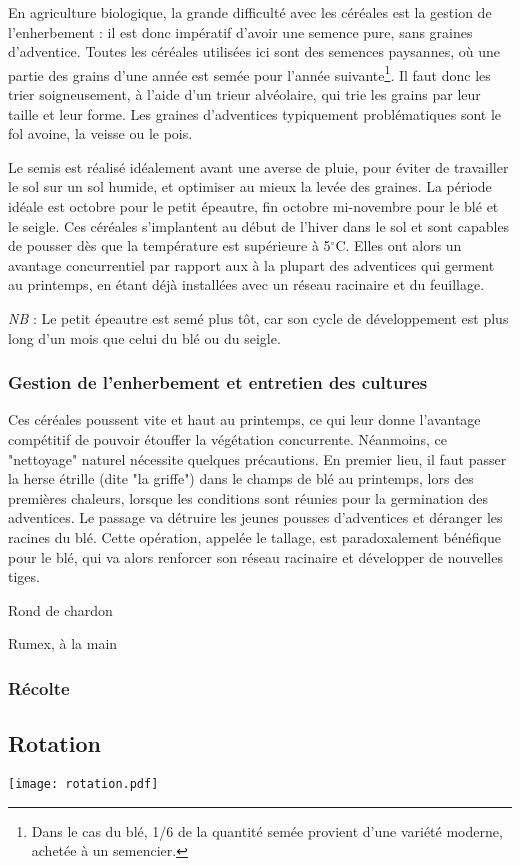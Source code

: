 \documentclass{article}
\begin{document}
En agriculture biologique, la grande difficulté avec les céréales est la gestion de l'enherbement : il est donc impératif d'avoir une semence pure, sans graines d'adventice. Toutes les céréales utilisées ici sont des semences paysannes, où une partie des grains d'une année est semée pour l'année suivante\footnote{Dans le cas du blé, 1/6 de la quantité semée provient d'une variété moderne, achetée à un semencier.}. Il faut donc les trier soigneusement, à l'aide d'un trieur alvéolaire, qui trie les grains par leur taille et leur forme. Les graines d'adventices typiquement problématiques sont le fol avoine, la veisse ou le pois. 

Le semis est réalisé idéalement avant une averse de pluie, pour éviter de travailler le sol sur un sol humide, et optimiser au mieux la levée des graines. La période idéale est octobre pour le petit épeautre, fin octobre mi-novembre pour le blé et le seigle. Ces céréales s'implantent au début de l'hiver dans le sol et sont capables de pousser dès que la température est supérieure à 5$^\circ$C. Elles ont alors un avantage concurrentiel par rapport aux à la plupart des adventices qui germent au printemps, en étant déjà installées avec un réseau racinaire et du feuillage.

\textit{NB} : Le petit épeautre est semé plus tôt, car son cycle de développement est plus long d'un mois que celui du blé ou du seigle.

\subsubsection*{Gestion de l'enherbement et entretien des cultures}

Ces céréales poussent vite et haut au printemps, ce qui leur donne l'avantage compétitif de pouvoir étouffer la végétation concurrente. Néanmoins, ce "nettoyage" naturel nécessite quelques précautions. En premier lieu, il faut passer la herse étrille (dite "la griffe") dans le champs de blé au printemps, lors des premières chaleurs, lorsque les conditions sont réunies pour la germination des adventices. Le passage va détruire les jeunes pousses d'adventices et déranger les racines du blé. Cette opération, appelée le tallage, est paradoxalement bénéfique pour le blé, qui va alors renforcer son réseau racinaire et développer de nouvelles tiges. 

Rond de chardon

Rumex, à la main

\subsubsection*{Récolte}


\subsection{Rotation}

\begin{center}
	\texttt{[image: rotation.pdf]}
\end{center}
\end{document}
